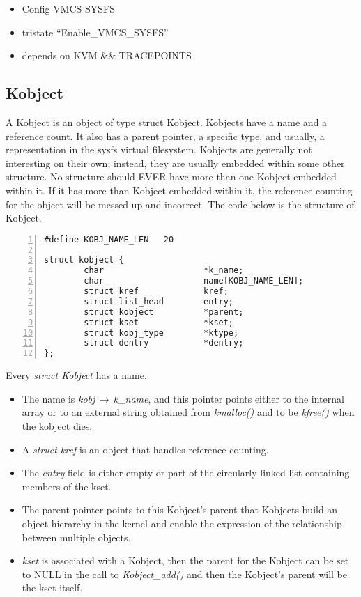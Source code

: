 \documentclass[10pt,draftclsnofoot,journal,compsoc,onecolumn]{IEEEtran}
\begin{document}
\begin{itemize}
\item Config VMCS SYSFS
\item tristate “Enable\_VMCS\_SYSFS”
\item depends on KVM \&\& TRACEPOINTS
\end{itemize}

\subsection{Kobject}
\par A Kobject is an object of type struct Kobject.  Kobjects have a name and a reference count. It also has a parent pointer, a specific type, and usually, a representation in the sysfs virtual filesystem.
Kobjects are generally not interesting on their own; instead, they are usually embedded within some other structure.
No structure should EVER have more than one Kobject embedded within it.
If it has more than Kobject embedded within it, the reference counting for the object will be messed up and incorrect.
The code below is the structure of Kobject.

\begin{lstlisting}[numbers=left]
#define KOBJ_NAME_LEN   20

struct kobject {
        char                    *k_name;
        char                    name[KOBJ_NAME_LEN];
        struct kref             kref;
        struct list_head        entry;
        struct kobject          *parent;
        struct kset             *kset;
        struct kobj_type        *ktype;
        struct dentry           *dentry;
};

\end{lstlisting}

Every \textit{struct Kobject} has a name.
\begin{itemize}

\item The name is \textit{kobj$\,\to\,$k\_name}, and this pointer points either to the internal array or to an external string obtained from \textit{kmalloc()} and to be \textit{kfree()} when the kobject dies.

\item A \textit{struct kref} is an object that handles reference counting.

\item The \textit{entry} field is either empty or part of the circularly linked list containing members of the kset.

\item The parent pointer points to this Kobject’s parent that Kobjects build an object hierarchy in the kernel and
enable the expression of the relationship between multiple objects. 

\item \textit{kset} is associated with a Kobject, then the parent for the Kobject can be set to NULL in the call to \textit{Kobject\_add()} and then the Kobject's parent will be the kset itself.


\end{itemize}
\end{document}
